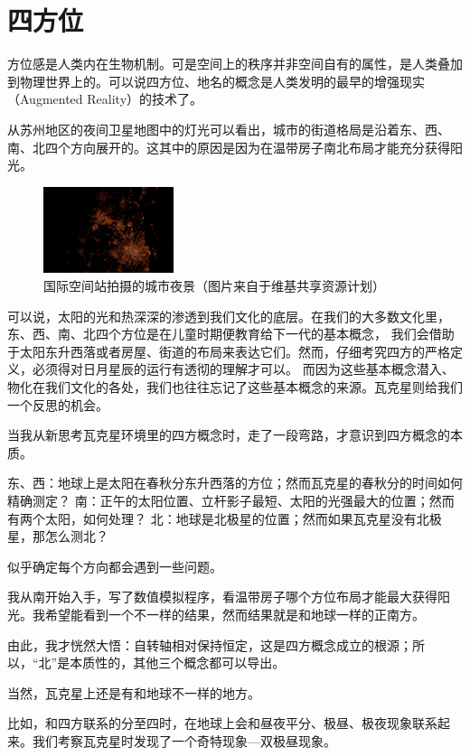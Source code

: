 \documentclass[a4paper,10.5pt]{book}
\begin{document}
\section{四方位}

方位感是人类内在生物机制。可是空间上的秩序并非空间自有的属性，是人类叠加到物理世界上的。可以说四方位、地名的概念是人类发明的最早的增强现实（Augmented Reality）的技术了。

从苏州地区的夜间卫星地图中的灯光可以看出，城市的街道格局是沿着东、西、南、北四个方向展开的。这其中的原因是因为在温带房子南北布局才能充分获得阳光。

\begin{figure}[ht]
\centering
\includegraphics[width=1.5in]{images/4_01-ISS-30_Nighttime_view_of_Shanghai.jpg}
\caption{国际空间站拍摄的城市夜景（图片来自于维基共享资源计划）}
\end{figure}

可以说，太阳的光和热深深的渗透到我们文化的底层。在我们的大多数文化里，东、西、南、北四个方位是在儿童时期便教育给下一代的基本概念，
我们会借助于太阳东升西落或者房屋、街道的布局来表达它们。然而，仔细考究四方的严格定义，必须得对日月星辰的运行有透彻的理解才可以。
而因为这些基本概念潜入、物化在我们文化的各处，我们也往往忘记了这些基本概念的来源。瓦克星则给我们一个反思的机会。

当我从新思考瓦克星环境里的四方概念时，走了一段弯路，才意识到四方概念的本质。

东、西：地球上是太阳在春秋分东升西落的方位；然而瓦克星的春秋分的时间如何精确测定？
南：正午的太阳位置、立杆影子最短、太阳的光强最大的位置；然而有两个太阳，如何处理？
北：地球是北极星的位置；然而如果瓦克星没有北极星，那怎么测北？

似乎确定每个方向都会遇到一些问题。

我从南开始入手，写了数值模拟程序，看温带房子哪个方位布局才能最大获得阳光。我希望能看到一个不一样的结果，然而结果就是和地球一样的正南方。

由此，我才恍然大悟：自转轴相对保持恒定，这是四方概念成立的根源；所以，“北”是本质性的，其他三个概念都可以导出。

当然，瓦克星上还是有和地球不一样的地方。

比如，和四方联系的分至四时，在地球上会和昼夜平分、极昼、极夜现象联系起来。我们考察瓦克星时发现了一个奇特现象—双极昼现象。
\end{document}

